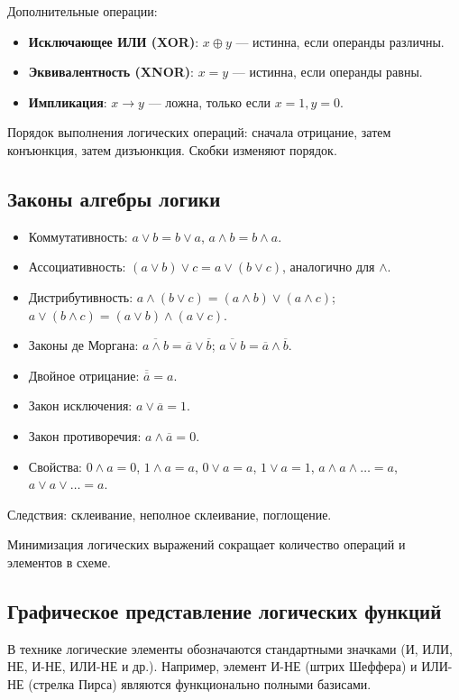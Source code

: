 \documentclass[a4paper,14pt]{report}
\begin{document}
Дополнительные операции:
\begin{itemize}
    \item \textbf{Исключающее ИЛИ (XOR)}: $x \oplus y$ — истинна, если операнды различны.
    \item \textbf{Эквивалентность (XNOR)}: $x = y$ — истинна, если операнды равны.
    \item \textbf{Импликация}: $x \rightarrow y$ — ложна, только если $x=1, y=0$.
\end{itemize}

Порядок выполнения логических операций: сначала отрицание, затем конъюнкция, затем дизъюнкция. Скобки изменяют порядок.

\subsection{Законы алгебры логики}
\begin{itemize}
    \item Коммутативность: $a\lor b = b\lor a$, $a\land b = b\land a$.
    \item Ассоциативность: $(a\lor b)\lor c = a\lor(b\lor c)$, аналогично для $\land$.
    \item Дистрибутивность: $a\land(b\lor c) = (a\land b)\lor(a\land c)$; $a\lor(b\land c) = (a\lor b)\land(a\lor c)$.
    \item Законы де Моргана: $\overline{a\land b} = \overline{a}\lor\overline{b}$; $\overline{a\lor b} = \overline{a}\land\overline{b}$.
    \item Двойное отрицание: $\overline{\overline{a}} = a$.
    \item Закон исключения: $a\lor\overline{a}=1$.
    \item Закон противоречия: $a\land\overline{a}=0$.
    \item Свойства: $0\land a=0$, $1\land a=a$, $0\lor a=a$, $1\lor a=1$, $a\land a\land\ldots=a$, $a\lor a\lor\ldots=a$.
\end{itemize}

Следствия: склеивание, неполное склеивание, поглощение.

Минимизация логических выражений сокращает количество операций и элементов в схеме.

\subsection{Графическое представление логических функций}
В технике логические элементы обозначаются стандартными значками (И, ИЛИ, НЕ, И-НЕ, ИЛИ-НЕ и др.). Например, элемент И-НЕ (штрих Шеффера) и ИЛИ-НЕ (стрелка Пирса) являются функционально полными базисами.
\end{document}
